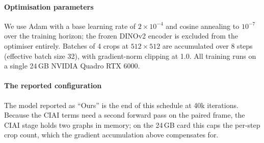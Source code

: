 \paragraph{Optimisation parameters}
We use Adam with a base learning rate of $2 \times 10^{-4}$ and cosine annealing
to $10^{-7}$ over the training horizon; the frozen DINOv2 encoder is excluded
from the optimiser entirely.
Batches of 4 crops at $512 \times 512$ are accumulated over 8 steps (effective
batch size 32), with gradient-norm clipping at 1.0.
All training runs on a single 24\,GB NVIDIA Quadro RTX 6000.

\paragraph{The reported configuration}
The model reported as ``Ours'' is the end of this schedule at 40k iterations. Because the
CIAI terms need a second forward pass on the paired frame, the CIAI stage holds two graphs
in memory; on the 24\,GB card this caps the per-step crop count, which the gradient
accumulation above compensates for.
